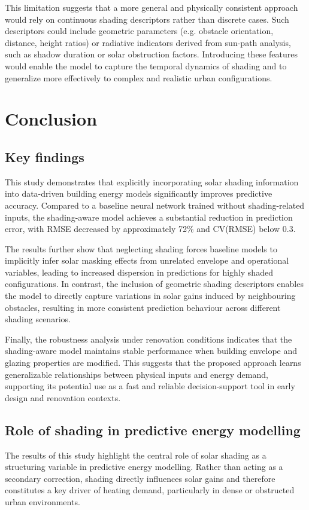 \documentclass{article}
\begin{document}
This limitation suggests that a more general and physically consistent approach
would rely on continuous shading descriptors rather than discrete cases. Such
descriptors could include geometric parameters (e.g. obstacle orientation,
distance, height ratios) or radiative indicators derived from sun-path analysis,
such as shadow duration or solar obstruction factors. Introducing these features
would enable the model to capture the temporal dynamics of shading and to
generalize more effectively to complex and realistic urban configurations.


\section{Conclusion}
\subsection{Key findings}
This study demonstrates that explicitly incorporating solar shading information
into data-driven building energy models significantly improves predictive
accuracy. Compared to a baseline neural network trained without shading-related
inputs, the shading-aware model achieves a substantial reduction in prediction
error, with RMSE decreased by approximately 72\% and CV(RMSE) below 0.3.

The results further show that neglecting shading forces baseline models to
implicitly infer solar masking effects from unrelated envelope and operational
variables, leading to increased dispersion in predictions for highly shaded
configurations. In contrast, the inclusion of geometric shading descriptors
enables the model to directly capture variations in solar gains induced by
neighbouring obstacles, resulting in more consistent prediction behaviour across
different shading scenarios.

Finally, the robustness analysis under renovation conditions indicates that the
shading-aware model maintains stable performance when building envelope and
glazing properties are modified. This suggests that the proposed approach learns
generalizable relationships between physical inputs and energy demand, supporting
its potential use as a fast and reliable decision-support tool in early design
and renovation contexts.
\subsection{Role of shading in predictive energy modelling}
The results of this study highlight the central role of solar shading as a
structuring variable in predictive energy modelling. Rather than acting as a
secondary correction, shading directly influences solar gains and therefore
constitutes a key driver of heating demand, particularly in dense or obstructed
urban environments.
\end{document}
